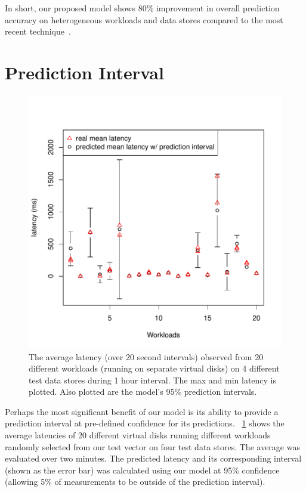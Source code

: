In short, our proposed model shows 80\% improvement in overall prediction accuracy on heterogeneous workloads and data stores compared to the most recent technique~\cite{gulati:2011}.

\section{Prediction Interval}
\begin{figure}[!t]
\centering
\includegraphics[width=0.6\columnwidth, clip, trim=0 0.2in 0 0.7in]{figure/prediction_interval2.pdf}
\caption{The average latency (over 20 second intervals) observed from
  20 different workloads (running on separate virtual disks) on 4
  different test data stores during 1 hour interval.  The max and min
  latency is plotted. Also plotted are the model's 95\% prediction
  intervals.}
\label{predInterval}
\end{figure}

Perhaps the most significant benefit of our model is its ability to provide a prediction interval at pre-defined confidence for its predictions.
\figurename~\ref{predInterval} shows the average latencies of 20 different virtual disks running different workloads randomly selected from our test vector on four test data stores.
The average was evaluated over two minutes.
The predicted latency and its corresponding interval (shown as the error bar)  was calculated using our model at 95\% confidence (allowing 5\% of measurements to be outside of the prediction interval).

